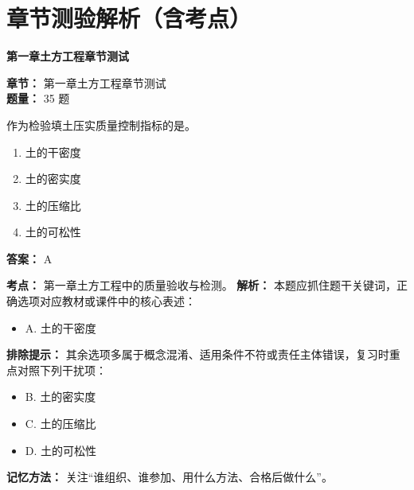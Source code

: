 \documentclass[UTF8,fontset=fandol,11pt]{ctexart}
\newcommand{\chaptertitle}[1]{\vspace{0.5em}\begin{tcolorbox}[enhanced,colback=deepblue,colframe=deepblue,arc=2mm,boxrule=0pt]\begin{center}\Large\bfseries\color{white}#1\end{center}\end{tcolorbox}\vspace{0.5em}}
\begin{document}
\newpage

\section*{章节测验解析（含考点）}


\chaptertitle{第一章土方工程章节测试}
\begin{mainbox}
\textbf{\textcolor{mainblue}{章节：}} 第一章土方工程章节测试\\
\textbf{\textcolor{answerred}{题量：}} 35 题
\end{mainbox}

\begin{quizbox}[title={第 1 题}]
作为检验填土压实质量控制指标的是。\\
\begin{enumerate}[label=\Alph*.]
\item 土的干密度
\item 土的密实度
\item 土的压缩比
\item 土的可松性
\end{enumerate}
\textbf{答案：} A
\vspace{0.25em}
\begin{answerbox}[title={考点解析}]
\textbf{考点：} 第一章土方工程中的质量验收与检测。
\textbf{解析：} 本题应抓住题干关键词，正确选项对应教材或课件中的核心表述：
\begin{itemize}
\item A. 土的干密度
\end{itemize}
\textbf{排除提示：} 其余选项多属于概念混淆、适用条件不符或责任主体错误，复习时重点对照下列干扰项：
\begin{itemize}
\item B. 土的密实度
\item C. 土的压缩比
\item D. 土的可松性
\end{itemize}
\textbf{记忆方法：} 关注“谁组织、谁参加、用什么方法、合格后做什么”。
\end{answerbox}
\end{quizbox}
\end{document}

